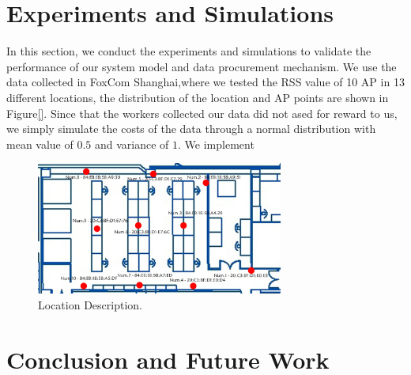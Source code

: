 \documentclass[10pt,conference,compsocconf,letterpaper]{IEEEtran}
\begin{document}
\section{Experiments and Simulations}\label{exp&sim}
In this section, we conduct the experiments and simulations to validate the performance of our system model and data procurement mechanism. We use the data collected in FoxCom Shanghai,where we tested the RSS value of 10 AP in 13 different locations, the distribution of the location and AP points are shown in Figure\ref{}. Since that the workers collected our data did not ased for reward to us, we simply simulate the costs of the data through a normal distribution with mean value of $0.5$ and variance of $1$. We implement
\begin{figure}[htbp]
\centering
\includegraphics[width =230pt ,keepaspectratio ]{exp-loc.png}
\caption{Location Description.}
\label{fig:exp-loc}
\end{figure}

\section{Conclusion and Future Work}\label{concandfuture}





%
\end{document}
